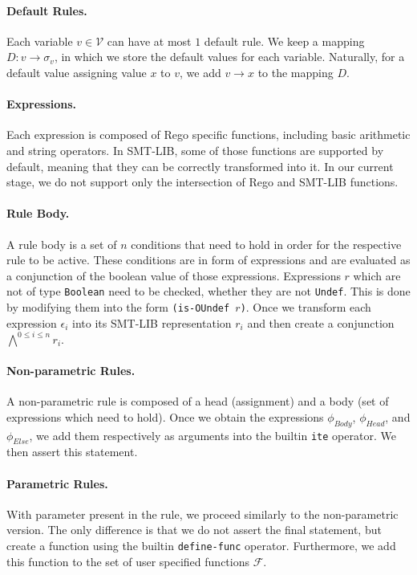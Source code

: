 \paragraph{Default Rules.}
\label{par:defaults}
Each variable $v \in \mathcal{V}$ can have at most $1$ default rule.
We keep a mapping $D: v \rightarrow \sigma_v$, in which we store the default values for each variable.
Naturally, for a default value assigning value $x$ to $v$, we add $v \rightarrow x$ to the mapping $D$.

\paragraph{Expressions.}
Each expression is composed of Rego specific functions, including basic arithmetic and string operators.
In SMT-LIB, some of those functions are supported by default, meaning that they can be correctly transformed into it.
In our current stage, we do not support only the intersection of Rego and SMT-LIB functions.

\paragraph{Rule Body.}
A rule body is a set of $n$ conditions that need to hold in order for the respective rule to be active.
These conditions are in form of expressions and are evaluated as a conjunction of the boolean value of those expressions.
Expressions $r$ which are not of type \texttt{Boolean} need to be checked, whether they are not \texttt{Undef}.
This is done by modifying them into the form \texttt{(is-OUndef $r$)}.
Once we transform each expression $\epsilon_i$ into its SMT-LIB representation $r_i$ and then create a conjunction $\bigwedge^{0 \leq i \leq n}r_i$.

\paragraph{Non-parametric Rules.}
A non-parametric rule is composed of a head (assignment) and a body (set of expressions which need to hold).
Once we obtain the expressions $\phi_{Body}$, $\phi_{Head}$, and $\phi_{Else}$, we add them respectively as arguments into the builtin \texttt{ite} operator.
We then assert this statement.

\paragraph{Parametric Rules.}
With parameter present in the rule, we proceed similarly to the non-parametric version.
The only difference is that we do not assert the final statement, but create a function using the builtin \texttt{define-func} operator.
Furthermore, we add this function to the set of user specified functions $\mathcal{F}$.


